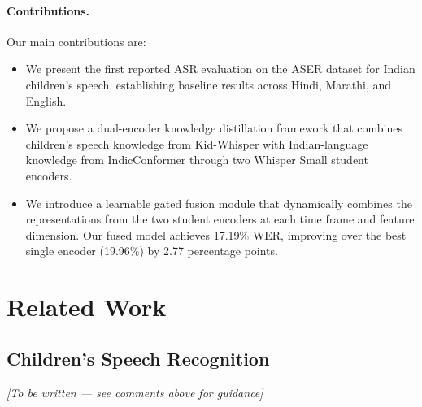 \documentclass{article} %
\begin{document}
\paragraph{Contributions.} Our main contributions are:
\begin{itemize}
    \item We present the first reported ASR evaluation on the ASER dataset for Indian children's speech, establishing baseline results across Hindi, Marathi, and English.
    \item We propose a dual-encoder knowledge distillation framework that combines children's speech knowledge from Kid-Whisper with Indian-language knowledge from IndicConformer through two Whisper Small student encoders.
    \item We introduce a learnable gated fusion module that dynamically combines the representations from the two student encoders at each time frame and feature dimension. Our fused model achieves 17.19\% WER, improving over the best single encoder (19.96\%) by 2.77 percentage points.
\end{itemize}

%
%
%
%
\section{Related Work}
\label{sec:related}

\subsection{Children's Speech Recognition}
\textit{[To be written --- see comments above for guidance]}
\end{document}
